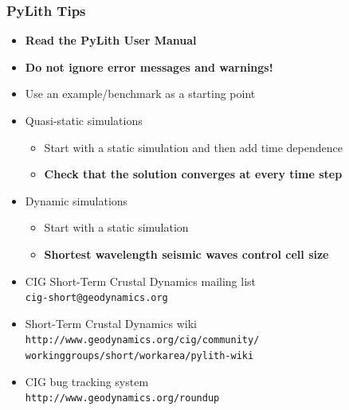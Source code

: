 \documentclass{beamer}
\newcommand{\important}[1]{{\bf\color{red}#1}}
\begin{document}
\begin{frame}
  \frametitle{PyLith Tips}
  \summary{}
 
  \begin{itemize}
  \item \important{Read the PyLith User Manual}
  \item \important{Do not ignore error messages and warnings!}
  \item Use an example/benchmark as a starting point
  \item Quasi-static simulations
    \begin{itemize}
    \item Start with a static simulation and then add time dependence
    \item \important{Check that the solution converges at every time step}
    \end{itemize}
  \item Dynamic simulations
    \begin{itemize}
    \item Start with a static simulation
    \item \important{Shortest wavelength seismic waves control cell size}
    \end{itemize}
  \item CIG Short-Term Crustal Dynamics mailing list\\
    {\tt cig-short@geodynamics.org}
  \item Short-Term Crustal Dynamics wiki\\
    {\tt http://www.geodynamics.org/cig/community/\\
    workinggroups/short/workarea/pylith-wiki}
  \item CIG bug tracking system\\
    {\tt http://www.geodynamics.org/roundup}
  \end{itemize}

\end{frame}
\end{document}
